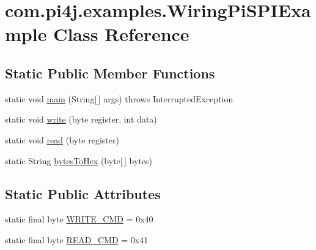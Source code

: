 \hypertarget{classcom_1_1pi4j_1_1examples_1_1WiringPiSPIExample}{}\section{com.\+pi4j.\+examples.\+Wiring\+Pi\+S\+P\+I\+Example Class Reference}
\label{classcom_1_1pi4j_1_1examples_1_1WiringPiSPIExample}
\subsection*{Static Public Member Functions}
\begin{DoxyCompactItemize}
\item 
static void \hyperlink{classcom_1_1pi4j_1_1examples_1_1WiringPiSPIExample_ad0fbe7c65dcb1b75f26ff7479ca29145}{main} (String\mbox{[}$\,$\mbox{]} args)  throws Interrupted\+Exception 
\item 
static void \hyperlink{classcom_1_1pi4j_1_1examples_1_1WiringPiSPIExample_adc092f7a20cd8da8c1780dd7f4c90da0}{write} (byte register, int data)
\item 
static void \hyperlink{classcom_1_1pi4j_1_1examples_1_1WiringPiSPIExample_a61d7617d5cd2d39e0610cce173bf52fc}{read} (byte register)
\item 
static String \hyperlink{classcom_1_1pi4j_1_1examples_1_1WiringPiSPIExample_ac3ffdcdb277786330c805db47a877f25}{bytes\+To\+Hex} (byte\mbox{[}$\,$\mbox{]} bytes)
\end{DoxyCompactItemize}
\subsection*{Static Public Attributes}
\begin{DoxyCompactItemize}
\item 
static final byte \hyperlink{classcom_1_1pi4j_1_1examples_1_1WiringPiSPIExample_a8589056f095327e06bc67ab04f2d4be2}{W\+R\+I\+T\+E\+\_\+\+C\+M\+D} = 0x40
\item 
static final byte \hyperlink{classcom_1_1pi4j_1_1examples_1_1WiringPiSPIExample_ab8252b9afb573cbf410f4e880d9533d4}{R\+E\+A\+D\+\_\+\+C\+M\+D} = 0x41
\end{DoxyCompactItemize}

